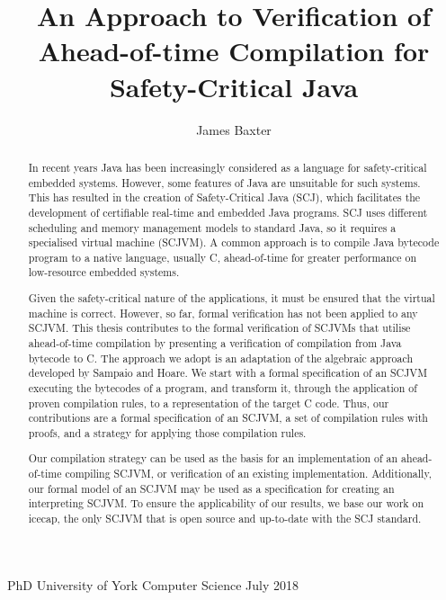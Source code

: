 \documentclass[a4paper,11pt,twoside,openright]{report}
\title{An Approach to Verification of Ahead-of-time Compilation for Safety-Critical Java}
\author{James Baxter}
\date{}
\begin{document}
\begin{titlepage}
  \centering{}
  \hfill
  \vfill
  \vfill
  \vfill
  {\Huge\bf \thetitle}
  \vfill
  \vfill
  {\huge \theauthor}
  \vfill
  \vfill
  {\LARGE PhD}
  \vfill
  {\LARGE University of York}
  \vfill
  {\LARGE Computer Science}
  \vfill
  {\LARGE July 2018}
\end{titlepage}

\cleardoublepage
{}
{}
\begin{abstract}
  \thispagestyle{plain}
  In recent years Java has been increasingly considered as a language
  for safety-critical embedded systems.
  However, some features of Java are unsuitable for such systems.
  This has resulted in the creation of Safety-Critical Java (SCJ),
  which facilitates the development of certifiable real-time and
  embedded Java programs.
  SCJ uses different scheduling and memory management models to
  standard Java, so it requires a specialised virtual machine (SCJVM).
  A common approach is to compile Java bytecode program to a native
  language, usually C, ahead-of-time for greater performance on
  low-resource embedded systems.
  
  Given the safety-critical nature of the applications, it must be
  ensured that the virtual machine is correct.
  However, so far, formal verification has not been applied to any
  SCJVM.
  This thesis contributes to the formal verification of SCJVMs that
  utilise ahead-of-time compilation by presenting a verification of
  compilation from Java bytecode to C.
  The approach we adopt is an adaptation of the algebraic approach
  developed by Sampaio and Hoare.
  We start with a formal specification of an SCJVM executing the
  bytecodes of a program, and transform it, through the application
  of proven compilation rules, to a representation of the target C
  code.
  Thus, our contributions are a formal specification of an SCJVM, a
  set of compilation rules with proofs, and a strategy for applying
  those compilation rules.
  
  Our compilation strategy can be used as the basis for an
  implementation of an ahead-of-time compiling SCJVM, or verification
  of an existing implementation.
  Additionally, our formal model of an SCJVM may be used as a
  specification for creating an interpreting SCJVM.
  To ensure the applicability of our results, we base our work on
  icecap, the only SCJVM that is open source and up-to-date with the
  SCJ standard.
\end{abstract}
\end{document}

